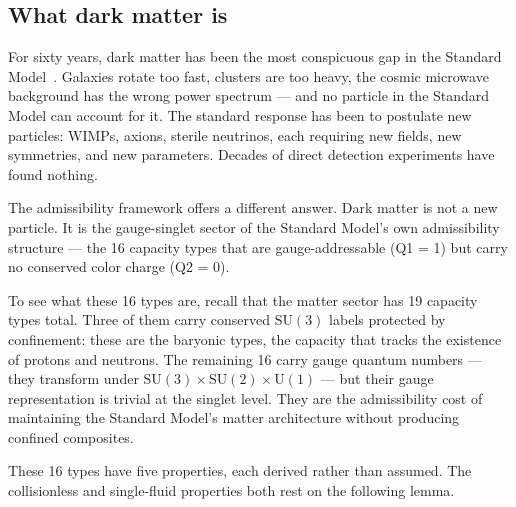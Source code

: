 \documentclass[11pt]{article}
\newcommand{\SU}{\mathrm{SU}}
\newcommand{\U}{\mathrm{U}}
\begin{document}
\subsection{What dark matter is}

For sixty years, dark matter has been the most conspicuous gap in the Standard Model~\cite{BertoneHooper2018}.  Galaxies rotate too fast, clusters are too heavy, the cosmic microwave background has the wrong power spectrum --- and no particle in the Standard Model can account for it.  The standard response has been to postulate new particles: WIMPs, axions, sterile neutrinos, each requiring new fields, new symmetries, and new parameters.  Decades of direct detection experiments have found nothing.

The admissibility framework offers a different answer.  Dark matter is not a new particle.  It is the gauge-singlet sector of the Standard Model's own admissibility structure --- the 16 capacity types that are gauge-addressable (Q1 = 1) but carry no conserved color charge (Q2 = 0).

To see what these 16 types are, recall that the matter sector has 19 capacity types total.  Three of them carry conserved $\SU(3)$ labels protected by confinement: these are the baryonic types, the capacity that tracks the existence of protons and neutrons.  The remaining 16 carry gauge quantum numbers --- they transform under $\SU(3) \times \SU(2) \times \U(1)$ --- but their gauge representation is trivial at the singlet level.  They are the admissibility cost of maintaining the Standard Model's matter architecture without producing confined composites.

These 16 types have five properties, each derived rather than assumed.  The collisionless and single-fluid properties both rest on the following lemma.
\end{document}
